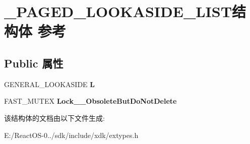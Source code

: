 \hypertarget{struct___p_a_g_e_d___l_o_o_k_a_s_i_d_e___l_i_s_t}{}\section{\+\_\+\+P\+A\+G\+E\+D\+\_\+\+L\+O\+O\+K\+A\+S\+I\+D\+E\+\_\+\+L\+I\+S\+T结构体 参考}
\label{struct___p_a_g_e_d___l_o_o_k_a_s_i_d_e___l_i_s_t}
\subsection*{Public 属性}
\begin{DoxyCompactItemize}
\item 
\mbox{\label{struct___p_a_g_e_d___l_o_o_k_a_s_i_d_e___l_i_s_t_a361a321a898e28978bab77efb10bb59c}} 
G\+E\+N\+E\+R\+A\+L\+\_\+\+L\+O\+O\+K\+A\+S\+I\+DE {\bfseries L}
\item 
\mbox{\label{struct___p_a_g_e_d___l_o_o_k_a_s_i_d_e___l_i_s_t_abda497630596a75a736217f7d017b940}} 
F\+A\+S\+T\+\_\+\+M\+U\+T\+EX {\bfseries Lock\+\_\+\+\_\+\+Obsolete\+But\+Do\+Not\+Delete}
\end{DoxyCompactItemize}


该结构体的文档由以下文件生成\+:\begin{DoxyCompactItemize}
\item 
E\+:/\+React\+O\+S-\/0../sdk/include/xdk/extypes.\+h\end{DoxyCompactItemize}
